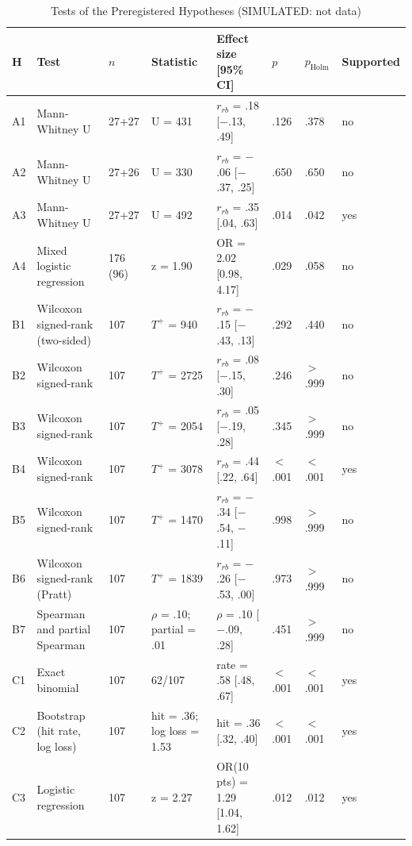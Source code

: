 
\begin{table}[htbp]
\centering
\begin{threeparttable}
\caption{Tests of the Preregistered Hypotheses (SIMULATED: not data)}
\label{tab:hypotheses}
\footnotesize
\begin{tabular}{llllllll}
\toprule
H & Test & $n$ & Statistic & Effect size [95\% CI] & $p$ & $p_{\text{Holm}}$ & Supported \\
\midrule
A1 & Mann-Whitney U & 27+27 & U = 431 & $r_{rb}$ = .18 [$-$.13, .49] & .126 & .378 & no \\
A2 & Mann-Whitney U & 27+26 & U = 330 & $r_{rb}$ = $-$.06 [$-$.37, .25] & .650 & .650 & no \\
A3 & Mann-Whitney U & 27+27 & U = 492 & $r_{rb}$ = .35 [.04, .63] & .014 & .042 & yes \\
A4 & Mixed logistic regression & 176 (96) & z = 1.90 & OR = 2.02 [0.98, 4.17] & .029 & .058 & no \\
B1 & Wilcoxon signed-rank (two-sided) & 107 & $T^{+}$ = 940 & $r_{rb}$ = $-$.15 [$-$.43, .13] & .292 & .440 & no \\
B2 & Wilcoxon signed-rank & 107 & $T^{+}$ = 2725 & $r_{rb}$ = .08 [$-$.15, .30] & .246 & $>$ .999 & no \\
B3 & Wilcoxon signed-rank & 107 & $T^{+}$ = 2054 & $r_{rb}$ = .05 [$-$.19, .28] & .345 & $>$ .999 & no \\
B4 & Wilcoxon signed-rank & 107 & $T^{+}$ = 3078 & $r_{rb}$ = .44 [.22, .64] & $<$ .001 & $<$ .001 & yes \\
B5 & Wilcoxon signed-rank & 107 & $T^{+}$ = 1470 & $r_{rb}$ = $-$.34 [$-$.54, $-$.11] & .998 & $>$ .999 & no \\
B6 & Wilcoxon signed-rank (Pratt) & 107 & $T^{+}$ = 1839 & $r_{rb}$ = $-$.26 [$-$.53, .00] & .973 & $>$ .999 & no \\
B7 & Spearman and partial Spearman & 107 & $\rho$ = .10; partial = .01 & $\rho$ = .10 [$-$.09, .28] & .451 & $>$ .999 & no \\
C1 & Exact binomial & 107 & 62/107 & rate = .58 [.48, .67] & $<$ .001 & $<$ .001 & yes \\
C2 & Bootstrap (hit rate, log loss) & 107 & hit = .36; log loss = 1.53 & hit = .36 [.32, .40] & $<$ .001 & $<$ .001 & yes \\
C3 & Logistic regression & 107 & z = 2.27 & OR(10 pts) = 1.29 [1.04, 1.62] & .012 & .012 & yes \\

\end{tabular}
\end{threeparttable}
\end{table}
